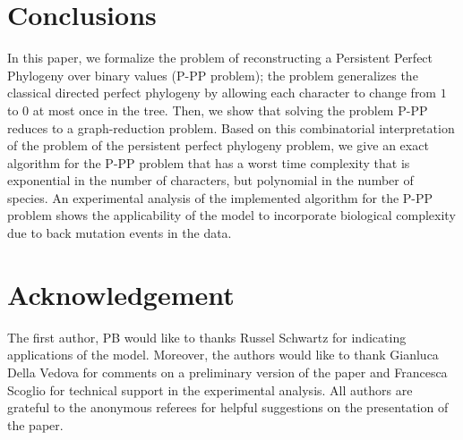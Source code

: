 \documentclass{llncs}
\begin{document}
\section{Conclusions}

In this paper, we formalize the problem of reconstructing a Persistent Perfect Phylogeny over binary values (P-PP problem); the problem generalizes  the classical directed perfect phylogeny by allowing each character to change from $1$ to $0$ at most once in the tree.
Then, we show that  solving the problem P-PP reduces to a graph-reduction problem.   Based on this combinatorial interpretation of the problem of the persistent perfect phylogeny  problem, we give an exact algorithm for the P-PP problem that has a worst time complexity that is exponential in the number of characters,  but polynomial in the number of species. 
An experimental analysis of the implemented algorithm for the P-PP problem  shows the applicability of the model  to incorporate biological complexity due to  back mutation events in the data.


\section{Acknowledgement}
The first author, PB would like to thanks Russel Schwartz for indicating applications of the model. Moreover, the authors would like to thank Gianluca Della Vedova for comments on a preliminary version of the paper and Francesca Scoglio for technical support in the experimental analysis.
All authors are grateful to the anonymous referees for helpful suggestions on the presentation of the paper.






 
\end{document}
